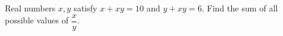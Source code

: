 Real numbers $x,y$ satisfy $x+xy=10$ and $y+xy=6$. Find the sum of all possible values of $\dfrac{x}{y}$.
